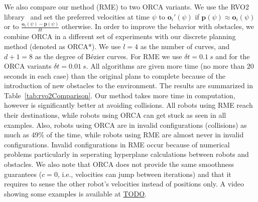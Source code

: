 \documentclass{svproc}
\newcommand{\vp}{\mathbf{p}}
\newcommand{\vo}{\mathbf{o}}
\begin{document}
We also compare our method (RME) to two ORCA variants.
We use the RVO2 library~\cite{orca} and set the preferred velocities at time $\psi$ to $\vo_i'(\psi)$ if $\vp(\psi)\approx \vo_i(\psi)$ or to $\frac{\vo_i(\psi) - \vp(\psi)}{\delta t}$ otherwise.
In order to improve the behavior with obstacles, we combine ORCA in a different set of experiments with our discrete planning method (denoted as ORCA*).
We use $l=4$ as the number of curves, and $d+1=8$ as the degree of B\'ezier curves.
For RME we use $\delta t = \SI{0.1}{s}$ and for the ORCA variants $\delta t = \SI{0.01}{s}$.
All algorithms are given more time (no more than $20$ seconds in each case) than the original plans to complete because of the introduction of new obstacles to the environment.
The results are summarized in Table~\ref{tab:rvo2Comparison}.
Our method takes more time in computation, however is significantly better at avoiding collisions.
All robots using RME reach their destinations, while robots using ORCA can get stuck as seen in all examples.
Also, robots using ORCA are in invalid configurations (collisions) as much as 49\% of the time, while robots using RME are almost never in invalid configurations.
Invalid configurations in RME occur because of numerical problems particularly in seperating hyperplane calculations between robots and obstacles.
We also note that ORCA does not provide the same smoothness guarantees ($c=0$, i.e., velocities can jump between iterations) and that it requires to sense the other robot's velocities instead of positions only.
A video showing some examples is available at \url{TODO}.
\end{document}
